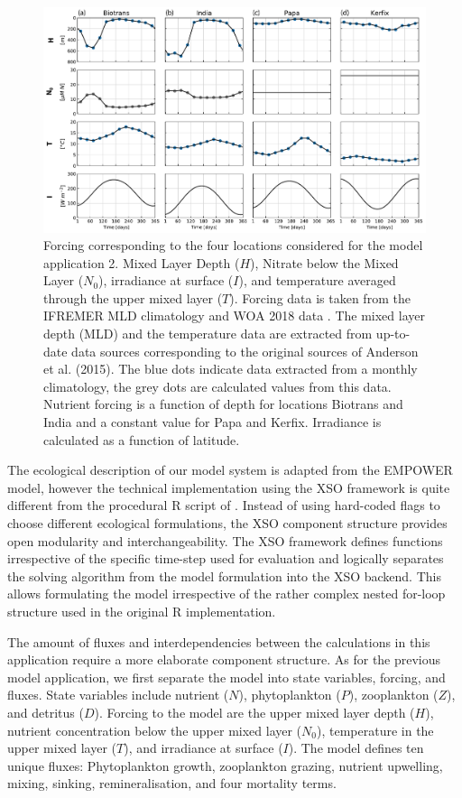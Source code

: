 \documentclass[journal abbreviation, manuscript]{copernicus}
\begin{document}
\begin{figure}[t]
\includegraphics[width=15cm]{Figures/firstdraft_plots/02_EMPOWER_forcing.pdf}
\caption{Forcing corresponding to the four locations considered for the model application 2. Mixed Layer Depth ($H$), Nitrate below the Mixed Layer ($N_0$), irradiance at surface ($I$), and temperature averaged through the upper mixed layer ($T$). Forcing data is taken from the IFREMER MLD climatology \citep{DeBoyerMontegut2004} and WOA 2018 data \citep{Garcia2019WORLDSilicate}. The mixed layer depth (MLD) and the temperature data are extracted from up-to-date data sources corresponding to the original sources of Anderson et al. (2015). The blue dots indicate data extracted from a monthly climatology, the grey dots are calculated values from this data. Nutrient forcing is a function of depth for locations Biotrans and India and a constant value for Papa and Kerfix. Irradiance is calculated as a function of latitude.}
\label{Figure:EMPOWERforcing}
\end{figure}

The ecological description of our model system is adapted from the EMPOWER model, however the technical implementation using the XSO framework is quite different from the procedural R script of \citet{Anderson2015c}. Instead of using hard-coded flags to choose different ecological formulations, the XSO component structure provides open modularity and interchangeability. The XSO framework defines functions irrespective of the specific time-step used for evaluation and logically separates the solving algorithm from the model formulation into the XSO backend. This allows formulating the model irrespective of the rather complex nested for-loop structure used in the original R implementation.

The amount of fluxes and interdependencies between the calculations in this application require a more elaborate component structure. As for the previous model application, we first separate the model into state variables, forcing, and fluxes.  State variables include nutrient ($N$), phytoplankton ($P$), zooplankton ($Z$), and detritus ($D$). Forcing to the model are the upper mixed layer depth ($H$), nutrient concentration below the upper mixed layer ($N_0$), temperature in the upper mixed layer ($T$), and irradiance at surface ($I$). The model defines ten unique fluxes: Phytoplankton growth, zooplankton grazing, nutrient upwelling, mixing, sinking, remineralisation, and four mortality terms.
\end{document}
